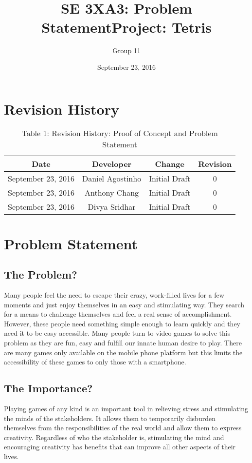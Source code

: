 \documentclass[11pt, oneside]{article}   	%
\title{SE 3XA3: Problem Statement}
\title{Project: Tetris}
\author{Group 11}
\date{September 23, 2016}							%
\begin{document}
\maketitle


\newpage
\tableofcontents
\section{Revision History}
\begin{table}[h!]
  \centering
  \caption{Table 1: Revision History: Proof of Concept and Problem Statement}
  \label{tab:table1}
  \begin{tabular}{cccc}
    Date & Developer & Change & Revision\\
    \hline
    September 23, 2016 & Daniel Agostinho & Initial Draft & 0\\
    \hline
    September 23, 2016 & Anthony Chang & Initial Draft & 0\\
    \hline
    September 23, 2016 & Divya Sridhar & Initial Draft & 0\\

  \end{tabular}
\end{table}


\section{Problem Statement}

\subsection{The Problem?}
Many people feel the need to escape their crazy, work-filled lives for a few moments and just enjoy themselves in an easy and stimulating way. They search for a means to challenge themselves and feel a real sense of accomplishment. However, these people need something simple enough to learn quickly and they need it to be easy accessible. Many people turn to video games to solve this problem as they are fun, easy and fulfill our innate human desire to play. There are many games only available on the mobile phone platform but this limits the accessibility of these games to only those with a smartphone.
\subsection{The Importance?}
Playing games of any kind is an important tool in relieving stress and stimulating the minds of the stakeholders. It allows them to temporarily disburden themselves from the responsibilities of the real world and allow them to express creativity. Regardless of who the stakeholder is, stimulating the mind and encouraging creativity has benefits that can improve all other aspects of their lives.
\end{document}

